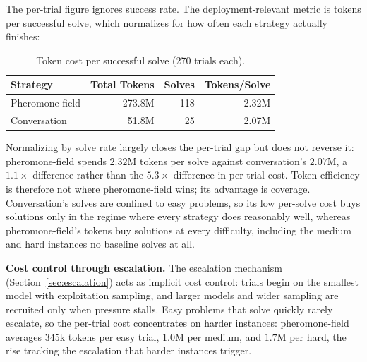 The per-trial figure ignores success rate. The deployment-relevant metric is tokens per successful solve, which normalizes for how often each strategy actually finishes:

\begin{table}[htbp]
\centering
\small
\begin{tabular}{@{}lrrr@{}}
\toprule
\textbf{Strategy} & \textbf{Total Tokens} & \textbf{Solves} & \textbf{Tokens/Solve} \\
\midrule
Pheromone-field & 273.8M & 118 & 2.32M \\
Conversation & 51.8M & 25 & 2.07M \\
\bottomrule
\end{tabular}
\caption{Token cost per successful solve (270 trials each).}
\label{tab:tokens-per-solve}
\end{table}

Normalizing by solve rate largely closes the per-trial gap but does not reverse it: pheromone-field spends $2.32$M tokens per solve against conversation's $2.07$M, a $1.1\times$ difference rather than the $5.3\times$ difference in per-trial cost. Token efficiency is therefore not where pheromone-field wins; its advantage is coverage. Conversation's solves are confined to easy problems, so its low per-solve cost buys solutions only in the regime where every strategy does reasonably well, whereas pheromone-field's tokens buy solutions at every difficulty, including the medium and hard instances no baseline solves at all.

\textbf{Cost control through escalation.} The escalation mechanism (Section~\ref{sec:escalation}) acts as implicit cost control: trials begin on the smallest model with exploitation sampling, and larger models and wider sampling are recruited only when pressure stalls. Easy problems that solve quickly rarely escalate, so the per-trial cost concentrates on harder instances: pheromone-field averages $345$k tokens per easy trial, $1.0$M per medium, and $1.7$M per hard, the rise tracking the escalation that harder instances trigger.
